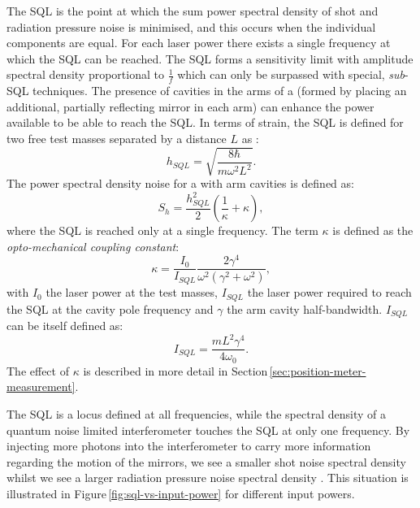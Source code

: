 The \gls{SQL} is the point at which the sum power spectral density of shot and radiation pressure noise is minimised, and this occurs when the individual components are equal. For each laser power there exists a single frequency at which the \gls{SQL} can be reached. The \gls{SQL} forms a sensitivity limit with amplitude spectral density proportional to $\frac{1}{f}$ which can only be surpassed with special, \emph{sub}-\gls{SQL} techniques. The presence of cavities in the arms of a \MI{} (formed by placing an additional, partially reflecting mirror in each arm) can enhance the power available to be able to reach the \gls{SQL}. In terms of strain, the \gls{SQL} is defined for two free test masses separated by a distance $L$ as \cite{Braginsky1996}:
\begin{equation}
  \label{eq:strainsql}
  h_{SQL} = \sqrt{\frac{8 \hbar}{m \omega^2 L^2}}.
\end{equation}
The power spectral density noise for a \MI{} with arm cavities is defined as:
\begin{equation}
  \label{eq:classicalifospectrum}
  S_h = \frac{h^{2}_{SQL}}{2} \left( \frac{1}{\kappa} + \kappa \right),
\end{equation}
where the \gls{SQL} is reached only at a single frequency. The term $\kappa$ is defined as the \emph{opto-mechanical coupling constant}:
\begin{equation}
 \kappa = \frac{I_0}{I_{SQL}} \frac{2 \gamma^4}{\omega^2 \left( \gamma^2 +
\omega^2 \right)},
 \label{eq:optomechanicalcoupling}
\end{equation}
with $I_0$ the laser power at the test masses, $I_{SQL}$ the laser power required to reach the \gls{SQL} at the cavity pole frequency and $\gamma$ the arm cavity half-bandwidth. $I_{SQL}$ can be itself defined as:
\begin{equation}
 I_{SQL} = \frac{m L^2 \gamma^4}{4 \omega_0}.
\end{equation}
The effect of $\kappa$ is described in more detail in Section\,\ref{sec:position-meter-measurement}.

The \gls{SQL} is a locus defined at all frequencies, while the spectral density of a quantum noise limited interferometer touches the \gls{SQL} at only one frequency. By injecting more photons into the interferometer to carry more information regarding the motion of the mirrors, we see a smaller shot noise spectral density whilst we see a larger radiation pressure noise spectral density \cite{Caves1981}. This situation is illustrated in Figure\,\ref{fig:sql-vs-input-power} for different input powers.


